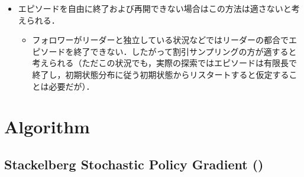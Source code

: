 \documentclass[a4paper,10pt,dvipdfmx]{jsarticle}
\begin{document}
\begin{itemize}
\begin{itemize}
\begin{itemize}
            でやっているのはこれではないか？
        \end{itemize}
        \item エピソードを自由に終了および再開できない場合はこの方法は適さないと考えられる．
        \begin{itemize}
            \item フォロワーがリーダーと独立している状況などではリーダーの都合でエピソードを終了できない．したがって割引サンプリングの方が適すると考えられる（ただこの状況でも，実際の探索ではエピソードは有限長で終了し，初期状態分布に従う初期状態からリスタートすると仮定することは必要だが）．
        \end{itemize}
    \end{itemize}
\end{itemize}


\section{Algorithm}

\subsection{Stackelberg Stochastic Policy Gradient ()}
\end{document}
